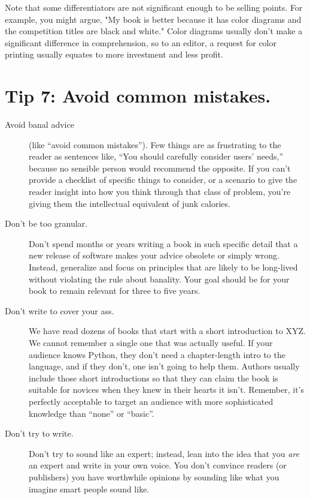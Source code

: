 \documentclass[10pt,letterpaper]{article}
\begin{document}
Note that some differentiators are not significant enough to be selling points.
For example, you might argue,
"My book is better because it has color diagrams and the competition titles are black and white." 
Color diagrams usually don't make a significant difference in comprehension,
so to an editor,
a request for color printing usually equates to more investment and less profit.

\section*{Tip 7: Avoid common mistakes.}

\begin{description}

\item[Avoid banal advice]
  (like ``avoid common mistakes'').
  Few things are as frustrating to the reader as sentences like,
  ``You should carefully consider users' needs,''
  because no sensible person would recommend the opposite.
  If you can't provide a checklist of specific things to consider,
  or a scenario to give the reader insight into how you think through that class of problem,
  you're giving them the intellectual equivalent of junk calories.
  
\item[Don't be too granular.]
  Don't spend months or years writing a book in such specific detail
  that a new release of software makes your advice obsolete or simply wrong.
  Instead, generalize and focus on principles that are likely to be long-lived
  without violating the rule about banality.
  Your goal should be for your book to remain relevant for three to five years.
  
\item[Don't write to cover your ass.]
  We have read dozens of books that start with a short introduction to XYZ.
  We cannot remember a single one that was actually useful.
  If your audience knows Python,
  they don't need a chapter-length intro to the language,
  and if they don't,
  one isn't going to help them.
  Authors usually include those short introductions
  so that they can claim the book is suitable for novices
  when they knew in their hearts it isn't.
  Remember,
  it's perfectly acceptable to target an audience with more sophisticated knowledge
  than ``none'' or ``basic''.
    
\item[Don't try to write.]
  Don't try to sound like an expert;
  instead,
  lean into the idea that you \emph{are} an expert and write in your own voice.
  You don't convince readers (or publishers) you have worthwhile opinions
  by sounding like what you imagine smart people sound like.
  

\end{description}
\end{document}
